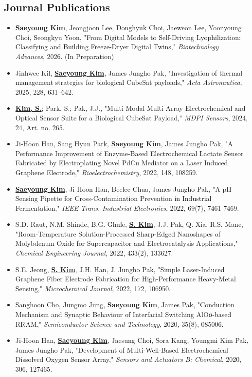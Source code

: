 \documentclass[letterpaper,11pt]{moderncv}
\begin{document}
\subsection{Journal Publications}
\begin{sloppypar}
\begin{itemize}[leftmargin=1cm, itemsep=0pt, parsep=0pt]
    \item \textbf{\underline{Saeyoung Kim}}, Jeongjoon Lee, Donghyuk Choi, Jaeweon Lee, Yoonyoung Choi, Seongkyu Yoon, "From Digital Models to Self-Driving Lyophilization: Classifying and Building Freeze-Dryer Digital Twins," \textit{Biotechnology Advances}, 2026. (In Preparation)
    \item Jinhwee Kil, \textbf{\underline{Saeyoung Kim}}, James Jungho Pak, "Investigation of thermal management strategies for biological CubeSat payloads," \textit{Acta Astronautica}, 2025, 228, 631--642.
    \item \textbf{\underline{Kim, S.}}; Park, S.; Pak, J.J., "Multi-Modal Multi-Array Electrochemical and Optical Sensor Suite for a Biological CubeSat Payload," \textit{MDPI Sensors}, 2024, 24, Art. no. 265.
    \item Ji-Hoon Han, Sang Hyun Park, \textbf{\underline{Saeyoung Kim}}, James Jungho Pak, "A Performance Improvement of Enzyme-Based Electrochemical Lactate Sensor Fabricated by Electroplating Novel PdCu Mediator on a Laser Induced Graphene Electrode," \textit{Bioelectrochemistry}, 2022, 148, 108259.
    \item \textbf{\underline{Saeyoung Kim}}, Ji-Hoon Han, Beelee Chua, James Jungho Pak, "A pH Sensing Pipette for Cross-Contamination Prevention in Industrial Fermentation," \textit{IEEE Trans. Industrial Electronics}, 2022, 69(7), 7461-7469.
    \item S.D. Raut, N.M. Shinde, B.G. Ghule, \textbf{\underline{S. Kim}}, J.J. Pak, Q. Xia, R.S. Mane, "Room-Temperature Solution-Processed Sharp-Edged Nanoshapes of Molybdenum Oxide for Supercapacitor and Electrocatalysis Applications," \textit{Chemical Engineering Journal}, 2022, 433(2), 133627.
    \item S.E. Jeong, \textbf{\underline{S. Kim}}, J.H. Han, J. Jungho Pak, "Simple Laser-Induced Graphene Fiber Electrode Fabrication for High-Performance Heavy-Metal Sensing," \textit{Microchemical Journal}, 2022, 172, 106950.
    \item Sanghoon Cho, Jungmo Jung, \textbf{\underline{Saeyoung Kim}}, James Pak, "Conduction Mechanism and Synaptic Behaviour of Interfacial Switching AlOσ-based RRAM," \textit{Semiconductor Science and Technology}, 2020, 35(8), 085006.
    \item Ji-Hoon Han, \textbf{\underline{Saeyoung Kim}}, Jaesung Choi, Sora Kang, Youngmi Kim Pak, James Jungho Pak, "Development of Multi-Well-Based Electrochemical Dissolved Oxygen Sensor Array," \textit{Sensors and Actuators B: Chemical}, 2020, 306, 127465.
\end{itemize}
\end{sloppypar}
\end{document}
